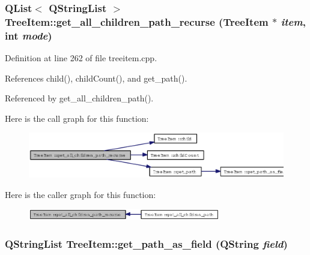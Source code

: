 \subsubsection{\setlength{\rightskip}{0pt plus 5cm}QList$<$ QString\-List $>$ Tree\-Item::get\_\-all\_\-children\_\-path\_\-recurse ({\bf Tree\-Item} $\ast$ {\em item}, int {\em mode})\hspace{0.3cm}{\tt  [private]}}\label{classTreeItem_35eb0e9477ec77668faf4040617df48d}




Definition at line 262 of file treeitem.cpp.

References child(), child\-Count(), and get\_\-path().

Referenced by get\_\-all\_\-children\_\-path().

Here is the call graph for this function:\begin{figure}[H]
\begin{center}
\leavevmode
\includegraphics[width=378pt]{classTreeItem_35eb0e9477ec77668faf4040617df48d_cgraph}
\end{center}
\end{figure}


Here is the caller graph for this function:\begin{figure}[H]
\begin{center}
\leavevmode
\includegraphics[width=238pt]{classTreeItem_35eb0e9477ec77668faf4040617df48d_icgraph}
\end{center}
\end{figure}
\subsubsection{\setlength{\rightskip}{0pt plus 5cm}QString\-List Tree\-Item::get\_\-path\_\-as\_\-field (QString {\em field})\hspace{0.3cm}{\tt  [private]}}\label{classTreeItem_a55f28f0c0a558f914759a6c8ebb28b9}




